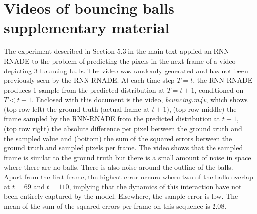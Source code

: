 \documentclass{article} %
\begin{document}
 \section{Videos of bouncing balls supplementary material}
The experiment described in Section 5.3 in the main text applied an RNN-RNADE to the problem of predicting the pixels in the next frame of a video depicting 3 bouncing balls. The video was randomly generated and has not been previously seen by the RNN-RNADE. At each time-step \(T=t\), the RNN-RNADE produces 1 sample from the predicted distribution at \(T=t+1\), conditioned on \(T<t+1\). Enclosed with this document is the video, {\it bouncing.m4v}, which shows (top row left) the ground truth (actual frame at \(t+1\)), (top row middle) the frame sampled by the RNN-RNADE from the predicted distribution at  \(t+1\), (top row right) the absolute difference per pixel between the ground truth and the sampled value and (bottom) the sum of the squared errors between the ground truth and sampled pixels per frame. The video shows that the sampled frame is similar to the ground truth but there is a small amount of noise in space where there are no balls. There is also noise around the outline of the balls. Apart from the first frame, the highest error occurs where two of the balls overlap at \(t=69\) and \(t=110\), implying that the dynamics of this interaction have not been entirely captured by the model. Elsewhere, the sample error is low. The mean of the sum of the squared errors per frame on this sequence is 2.08. 

\newpage


\end{document}

